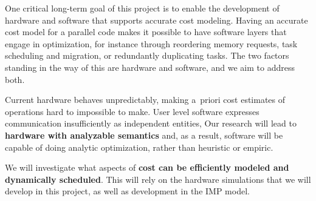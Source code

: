 One critical long-term goal of this project is to enable the development
of hardware and software that supports accurate cost modeling.
Having an accurate cost model for a parallel code makes it possible to 
have software layers that engage in optimization, for instance through
reordering memory requests, task scheduling and migration, 
or redundantly duplicating tasks. The two factors standing in the way of this
are hardware and software, and we aim to address both.

Current hardware behaves unpredictably, making a~priori cost estimates
of operations hard to impossible to make. User level software expresses communication 
insufficiently as independent entities, 
Our research will lead to \textbf{hardware with analyzable semantics}
and, as a result, software will be capable of doing
analytic optimization, rather than heuristic or empiric.

We will investigate what aspects of \textbf{cost can be efficiently modeled
and dynamically scheduled}. This will rely on the hardware simulations
that we will develop in this project, as well as development in the 
IMP model.

\endinput
\subsection{Power consumption}

Our ideas will lead to a reduction in power consumption in several ways.
\begin{itemize}
\item The snooping that cores do to maintain cache coherence leads to
  latency (see our analysis of the Intel~MIC in section~\ref{sec:hw})
  but it also takes considerable power. We reduce this by relying as
  much as possible on managed fast local memory.
\item A great deal of power is lost due to lack of management of DRAM
  pages. Since our model knows about data being communicated, we can
  optimize the loads from DRAM. Up to a factor of~5 in power savings
  is attainable here.
\item Managed local store leads to a lower demand for concurrency,
  leading to simpler processor design, which may also lower power
  demand.
\end{itemize}
We will analyze these aspects both through analytical reasoning and simulation.

\textbf{Research into Enhanced Processor/Memory Data Motion Semantics\ }
%
Once the transparent cache has been removed as the interface to
memory, cache lines are no longer the only granularity at which data
can be moved around the system.  The elimination of caches also opens
up the consistency/ordering model considerably.  Using local memory,
we can reorder DRAM accesses on a much larger scale for efficiency.
It seems likely that significant advantages could accrue from
expanding the semantics of the processor to memory controller
interface to allow the processor to make higher-level requests.
   
